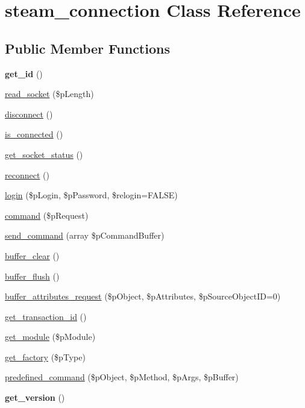 \hypertarget{classsteam__connection}{
\section{steam\_\-connection Class Reference}
\label{classsteam__connection}
}
\subsection*{Public Member Functions}
\begin{DoxyCompactItemize}
\item 
\hypertarget{classsteam__connection_a7127f9905766ba1af6b7779f76b3f1b7}{
{\bfseries get\_\-id} ()}
\label{classsteam__connection_a7127f9905766ba1af6b7779f76b3f1b7}

\item 
\hyperlink{classsteam__connection_a7c64a3d5de5e152c0750794e55132797}{read\_\-socket} (\$pLength)
\item 
\hyperlink{classsteam__connection_a48236ca8955da259d116462d7503e2ef}{disconnect} ()
\item 
\hyperlink{classsteam__connection_a616801b2735c0d8175ef2b678c0f5611}{is\_\-connected} ()
\item 
\hyperlink{classsteam__connection_a3035355ebd7b159628d829a9fc3fbbbf}{get\_\-socket\_\-status} ()
\item 
\hyperlink{classsteam__connection_a00bfaa24af7184d5901b88e0db7f2360}{reconnect} ()
\item 
\hyperlink{classsteam__connection_a7c8f25bb84a2e450bc0bca274575a2c5}{login} (\$pLogin, \$pPassword, \$relogin=FALSE)
\item 
\hyperlink{classsteam__connection_acc96563a6e045d998adfff203758e5d1}{command} (\$pRequest)
\item 
\hyperlink{classsteam__connection_a33114a4a96cbd4ff55c5629f394ca937}{send\_\-command} (array \$pCommandBuffer)
\item 
\hyperlink{classsteam__connection_a20cf4dc120f29b32b23e278971a2f30f}{buffer\_\-clear} ()
\item 
\hyperlink{classsteam__connection_a1a03e126a5cd5ee2bd9876c175fd01fc}{buffer\_\-flush} ()
\item 
\hyperlink{classsteam__connection_af953eaaab5340c7c4b9effdb7415f68b}{buffer\_\-attributes\_\-request} (\$pObject, \$pAttributes, \$pSourceObjectID=0)
\item 
\hyperlink{classsteam__connection_ab99ef754527b421bbfa3df9abfc780f4}{get\_\-transaction\_\-id} ()
\item 
\hyperlink{classsteam__connection_a44bb02d61c1b3a2b8d9f7b82b8211460}{get\_\-module} (\$pModule)
\item 
\hyperlink{classsteam__connection_ad94daf8e97d57bd388beaa50b2d6b0df}{get\_\-factory} (\$pType)
\item 
\hyperlink{classsteam__connection_ac0e324d3b310de75ca39fdcd3451db20}{predefined\_\-command} (\$pObject, \$pMethod, \$pArgs, \$pBuffer)
\item 
\hypertarget{classsteam__connection_a3e5176a80d42d0836645483df4b678f4}{
{\bfseries get\_\-version} ()}
\label{classsteam__connection_a3e5176a80d42d0836645483df4b678f4}


\end{DoxyCompactItemize}
